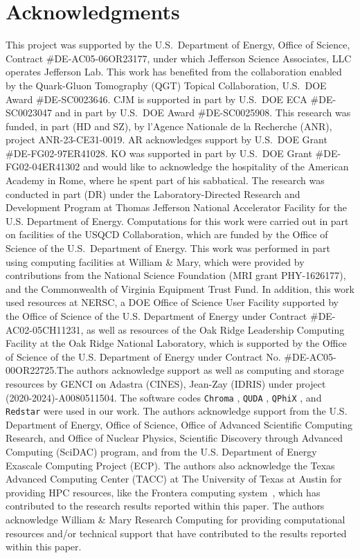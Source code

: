 \documentclass[aps,prl,groupedaddress,twocolumn,superscriptaddress,amsfonts,amssymb,amsmath,showpacs,floatfix,preprintnumbers]{revtex4-2}
\begin{document}
\section*{Acknowledgments}
This project was supported by the U.S.~Department of Energy, Office of Science, Contract \#DE-AC05-06OR23177, under which Jefferson Science Associates, LLC operates Jefferson Lab. This work has benefited from the collaboration enabled by the Quark-Gluon Tomography (QGT) Topical Collaboration, U.S.~DOE Award \mbox{\#DE-SC0023646}. CJM is supported in part by U.S.~DOE ECA \mbox{\#DE-SC0023047} and in part by U.S.~DOE Award \mbox{\#DE-SC0025908}.
This research was funded, in part (HD and SZ), by l’Agence Nationale de la Recherche (ANR), project ANR-23-CE31-0019. AR acknowledges support by U.S.~DOE Grant \mbox{\#DE-FG02-97ER41028}. 
KO was supported in part by U.S.~DOE Grant \mbox{\#DE-FG02-04ER41302} and would like to acknowledge the hospitality of the American Academy in Rome, where he spent part of his sabbatical. 
The research was conducted in part (DR) under the Laboratory-Directed
Research and Development Program at Thomas Jefferson National Accelerator Facility for the U.S. Department of Energy.
Computations for this work were carried out in part on facilities of the USQCD Collaboration, which are funded by the Office of Science of the U.S.~Department of Energy. This work was performed in part using computing facilities at William \& Mary, which were provided by contributions from the National Science Foundation (MRI grant PHY-1626177), and the Commonwealth of Virginia Equipment Trust Fund. In addition, this work used resources at NERSC, a DOE Office of Science User Facility supported by the Office of Science of the U.S. Department of Energy under Contract \#DE-AC02-05CH11231, as well as resources of the Oak Ridge Leadership Computing Facility at the Oak Ridge National Laboratory, which is supported by the Office of Science of the U.S. Department of Energy under Contract No. \mbox{\#DE-AC05-00OR22725}.The authors acknowledge support as well as computing and storage resources by GENCI on Adastra (CINES), Jean-Zay (IDRIS) under project (2020-2024)-A0080511504.
The software codes {\tt Chroma} \cite{Edwards:2004sx}, {\tt QUDA} \cite{Clark:2009wm, Babich:2010mu}, {\tt QPhiX} \cite{QPhiX2}, and {\tt Redstar} \cite{Chen:2023zyy} were used in our work. The authors acknowledge support from the U.S. Department of Energy, Office of Science, Office of Advanced Scientific Computing Research, and Office of Nuclear Physics, Scientific Discovery through Advanced Computing (SciDAC) program, and from the U.S. Department of Energy Exascale Computing Project (ECP). The authors also acknowledge the Texas Advanced Computing Center (TACC) at The University of Texas at Austin for providing HPC resources, like the Frontera computing system~\cite{frontera}, which has contributed to the research results reported within this paper. The authors acknowledge William \& Mary Research Computing for providing computational resources and/or technical support that have contributed to the results reported within this paper.




\end{document}
